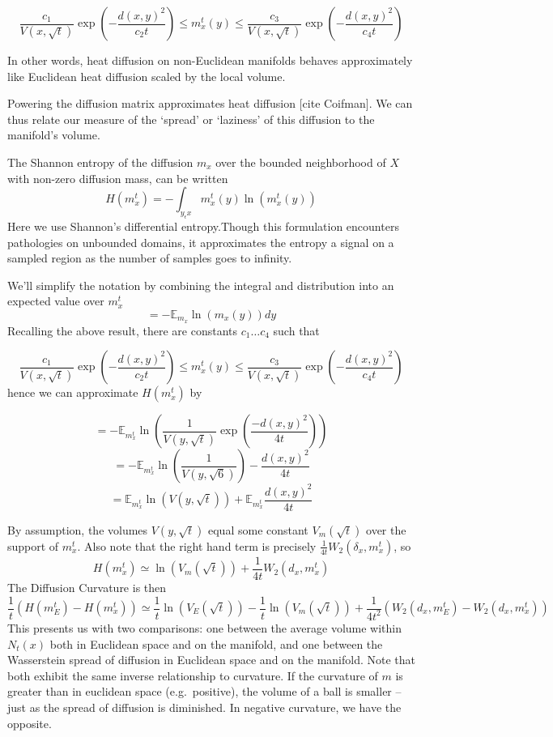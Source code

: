 \documentclass[
  letterpaper,
  DIV=11,
  numbers=noendperiod]{scrartcl}
\theoremstyle{plain}
\theoremstyle{plain}
\theoremstyle{definition}
\theoremstyle{definition}
\theoremstyle{remark}
\begin{document}
\[
\frac{c_1}{V(x, \sqrt{t})} \exp \left(-\frac{d(x, y)^2}{c_2 t}\right) \leq m_{x}^t(y) \leq \frac{c_3}{V(x, \sqrt{t})} \exp \left(-\frac{d(x, y)^2}{c_4 t}\right)
\]

In other words, heat diffusion on non-Euclidean manifolds behaves
approximately like Euclidean heat diffusion scaled by the local volume.

Powering the diffusion matrix approximates heat diffusion {[}cite
Coifman{]}. We can thus relate our measure of the `spread' or `laziness'
of this diffusion to the manifold's volume.

The Shannon entropy of the diffusion \(m_{x}\) over the bounded
neighborhood of \(X\) with non-zero diffusion mass, can be written \[
H\left(m_x^t\right)=-\int_{y_\epsilon x} m_x^t(y) \ln \left(m_x^t(y)\right)
\] Here we use Shannon's differential entropy.Though this formulation
encounters pathologies on unbounded domains, it approximates the entropy
a signal on a sampled region as the number of samples goes to infinity.

We'll simplify the notation by combining the integral and distribution
into an expected value over \(m_{x}^t\) \[
=-\mathbb{E}_{m_x} \ln \left(m_x(y)\right) d y
\] Recalling the above result, there are constants \(c_{1}\dots c_{4}\)
such that

\[
\frac{c_1}{V(x, \sqrt{t})} \exp \left(-\frac{d(x, y)^2}{c_2 t}\right) \leq m_{x}^t(y) \leq \frac{c_3}{V(x, \sqrt{t})} \exp \left(-\frac{d(x, y)^2}{c_4 t}\right)
\] hence we can approximate \(H(m_{x}^t)\) by

\[
=-\mathbb{E}_{m_{x}^t} \ln \left(\frac{1}{V(y, \sqrt{t})} \exp \left(\frac{-d(x, y)^2}{4 t}\right)\right)
\] \[
=-\mathbb{E}_{m_x^t} \ln \left(\frac{1}{V(y, \sqrt{6})}\right)-\frac{d(x, y)^2}{4 t}
\] \[
=\mathbb{E}_{m_x^t} \ln (V(y, \sqrt{t}))+\mathbb{E}_{m_{x}^t} \frac{d(x, y)^2}{4 t}
\]

By assumption, the volumes \(V(y,\sqrt{ t })\) equal some constant
\(V_{m}(\sqrt{ t })\) over the support of \(m_{x}^t\). Also note that
the right hand term is precisely
\(\frac{1}{4t}W_{2}(\delta_{x}, m_{x}^t)\), so \[
H(m_{x}^t) \simeq \ln(V_{m}(\sqrt{ t })) + \frac{1}{4t}W_{2}(d_{x},m_{x}^t)
\] The Diffusion Curvature is then \[
\frac{1}{t}(H(m_{E}^t) - H(m_{x}^t)) \simeq \frac{1}{t}\ln(V_{E}(\sqrt{ t })) - \frac{1}{t}\ln(V_{m}(\sqrt{ t })) + \frac{1}{4t^2}( W_{2}(d_{x},m_{E}^t) - W_{2}(d_{x},m_{x}^t))
\] This presents us with two comparisons: one between the average volume
within \(N_{t}(x)\) both in Euclidean space and on the manifold, and one
between the Wasserstein spread of diffusion in Euclidean space and on
the manifold. Note that both exhibit the same inverse relationship to
curvature. If the curvature of \(m\) is greater than in euclidean space
(e.g.~positive), the volume of a ball is smaller -- just as the spread
of diffusion is diminished. In negative curvature, we have the opposite.
\end{document}
